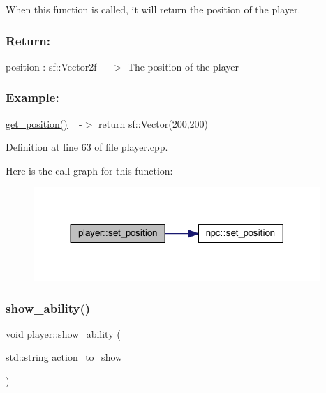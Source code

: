 When this function is called, it will return the position of the player.~\newline
 \subsubsection*{Return\+: }

position \+: sf\+::\+Vector2f ~\newline
-\/$>$ The position of the player

\subsubsection*{Example\+: }

\hyperlink{classplayer_a78d420774623e89cd896d3cb1d265b17}{get\+\_\+position()} ~\newline
-\/$>$ return sf\+::\+Vector(200,200) 

Definition at line 63 of file player.\+cpp.

Here is the call graph for this function\+:
\nopagebreak
\begin{figure}[H]
\begin{center}
\leavevmode
\includegraphics[width=308pt]{classplayer_a17ee5122ab15251afb54b4cdd42060e6_cgraph}
\end{center}
\end{figure}
\mbox{\label{classplayer_a4659a0677d5b19b0ae27737dfaa0176e}} 
\subsubsection{\texorpdfstring{show\+\_\+ability()}{show\_ability()}}
{\footnotesize\ttfamily void player\+::show\+\_\+ability (\begin{DoxyParamCaption}\item[{std\+::string}]{action\+\_\+to\+\_\+show }\end{DoxyParamCaption})}



